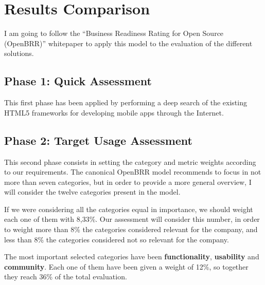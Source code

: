 \documentclass[a4paper,12pt]{book}
\begin{document}


\chapter{Results Comparison}
\label{chap:results}

I am going to follow the ``Business Readiness Rating for Open Source
(OpenBRR)'' whitepaper\cite{OpenBRRWhitepaper} to apply this model to the
evaluation of the different solutions.

\section{Phase 1: Quick Assessment}
\label{sec:phase1}
This first phase has been applied by performing a deep search of the existing HTML5 frameworks for developing mobile apps through the Internet.




\section{Phase 2: Target Usage Assessment}
\label{sec:phase2}
This second phase consists in setting the category and metric weights according to our requirements. The canonical OpenBRR model recommends to focus in not more than seven categories, but in order to provide a more general overview, I will consider the twelve categories present in the model.

If we were considering all the categories equal in importance, we should weight
each one of them with 8,33\%. Our assessment will consider this number, in
order to weight more than 8\% the categories considered relevant for the
company, and less than 8\% the categories considered not so relevant for the
company.

The most important selected categories have been \textbf{functionality},
\textbf{usability} and \textbf{community}. Each one of them have been given a
weight of 12\%, so together they reach 36\% of the total evaluation.
\end{document}
